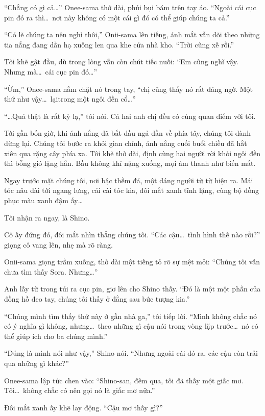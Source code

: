 \documentclass[../main.tex]{subfiles}
\begin{document}
``Chẳng có gì cả\dots'' Onee-sama thở dài, phủi bụi bám trên tay áo. ``Ngoài cái cục pin đó ra thì\dots\ nơi này không có một cái gì đó có thể giúp chúng ta cả.''

``Có lẽ chúng ta nên nghỉ thôi,'' Onii-sama lên tiếng, ánh mắt vẫn dõi theo những tia nắng đang dần hạ xuống len qua khe cửa nhà kho. ``Trời cũng xế rồi.''

Tôi khẽ gật đầu, dù trong lòng vẫn còn chút tiếc nuối: ``Em cũng nghĩ vậy. Nhưng mà\dots\ cái cục pin đó\dots''

``Ừm,'' Onee-sama nắm chặt nó trong tay, ``chị cũng thấy nó rất đáng ngờ. Một thứ như vậy\dots\ lạitrong một ngôi đền cổ\dots''

``\dots Quả thật là rất kỳ lạ,'' tôi nói. Cả hai anh chị đều có cùng quan điểm với tôi.

Tới gần bốn giờ, khi ánh nắng đã bắt đầu ngả dần về phía tây, chúng tôi đành dừng lại. Chúng tôi bước ra khỏi gian chính, ánh nắng cuối buổi chiều đã hắt xiên qua rặng cây phía xa. Tôi khẽ thở dài, định cùng hai người rời khỏi ngôi đền thì bỗng gió lặng hẳn. Bầu không khí nặng xuống, mọi âm thanh như biến mất.

Ngay trước mặt chúng tôi, nơi bậc thềm đá, một dáng người từ từ hiện ra. Mái tóc nâu dài tới ngang lưng, cái cài tóc kia, đôi mắt xanh tĩnh lặng, cùng bộ đồng phục màu xanh đậm ấy\dots

Tôi nhận ra ngay, là Shino.

Cô ấy đứng đó, đôi mắt nhìn thẳng chúng tôi. ``Các cậu\dots\ tình hình thế nào rồi?'' giọng cô vang lên, nhẹ mà rõ ràng.

Onii-sama giọng trầm xuống, thở dài một tiếng tỏ rõ sự mệt mỏi: ``Chúng tôi vẫn chưa tìm thấy Sora. Nhưng\dots''

Anh lấy từ trong túi ra cục pin, giơ lên cho Shino thấy. ``Đó là một một phần của đồng hồ đeo tay, chúng tôi thấy ở đằng sau bức tượng kia.''

``Chúng mình tìm thấy thứ này ở gần nhà ga,'' tôi tiếp lời. ``Mình không chắc nó có ý nghĩa gì không, nhưng\dots\ theo những gì cậu nói trong vòng lặp trước\dots\ nó có thể giúp ích cho ba chúng mình.''

``Đúng là mình nói như vậy,'' Shino nói. ``Nhưng ngoài cái đó ra, các cậu còn trải qua những gì khác?''

Onee-sama lập tức chen vào: ``Shino-san, đêm qua, tôi đã thấy một giấc mơ. Tôi\dots\ không chắc có nên gọi nó là giấc mơ nữa.''

Đôi mắt xanh ấy khẽ lay động. ``Cậu mơ thấy gì?''
\end{document}
